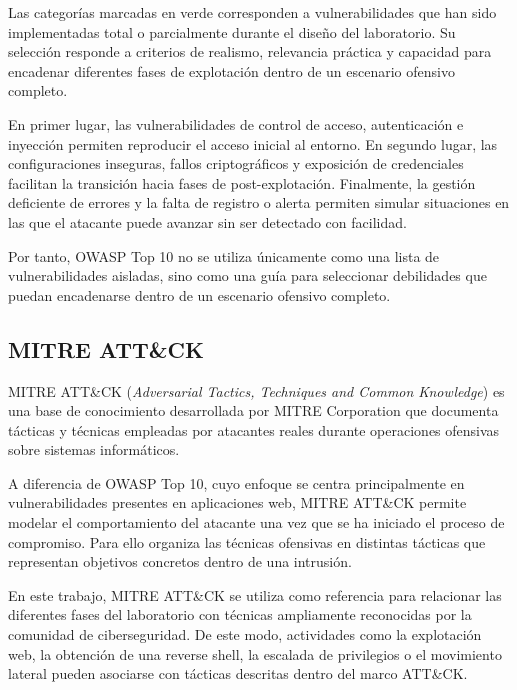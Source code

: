 Las categorías marcadas en verde corresponden a vulnerabilidades que han sido implementadas total o parcialmente durante el diseño del laboratorio. Su selección responde a criterios de realismo, relevancia práctica y capacidad para encadenar diferentes fases de explotación dentro de un escenario ofensivo completo.

En primer lugar, las vulnerabilidades de control de acceso, autenticación e inyección permiten reproducir el acceso inicial al entorno. En segundo lugar, las configuraciones inseguras, fallos criptográficos y exposición de credenciales facilitan la transición hacia fases de post-explotación. Finalmente, la gestión deficiente de errores y la falta de registro o alerta permiten simular situaciones en las que el atacante puede avanzar sin ser detectado con facilidad.

Por tanto, OWASP Top 10 no se utiliza únicamente como una lista de vulnerabilidades aisladas, sino como una guía para seleccionar debilidades que puedan encadenarse dentro de un escenario ofensivo completo.


\subsection{MITRE ATT\&CK}

MITRE ATT\&CK (\textit{Adversarial Tactics, Techniques and Common Knowledge}) es una base de conocimiento desarrollada por MITRE Corporation que documenta tácticas y técnicas empleadas por atacantes reales durante operaciones ofensivas sobre sistemas informáticos.

A diferencia de OWASP Top 10, cuyo enfoque se centra principalmente en vulnerabilidades presentes en aplicaciones web, MITRE ATT\&CK permite modelar el comportamiento del atacante una vez que se ha iniciado el proceso de compromiso. Para ello organiza las técnicas ofensivas en distintas tácticas que representan objetivos concretos dentro de una intrusión.

En este trabajo, MITRE ATT\&CK se utiliza como referencia para relacionar las diferentes fases del laboratorio con técnicas ampliamente reconocidas por la comunidad de ciberseguridad. De este modo, actividades como la explotación web, la obtención de una reverse shell, la escalada de privilegios o el movimiento lateral pueden asociarse con tácticas descritas dentro del marco ATT\&CK.

